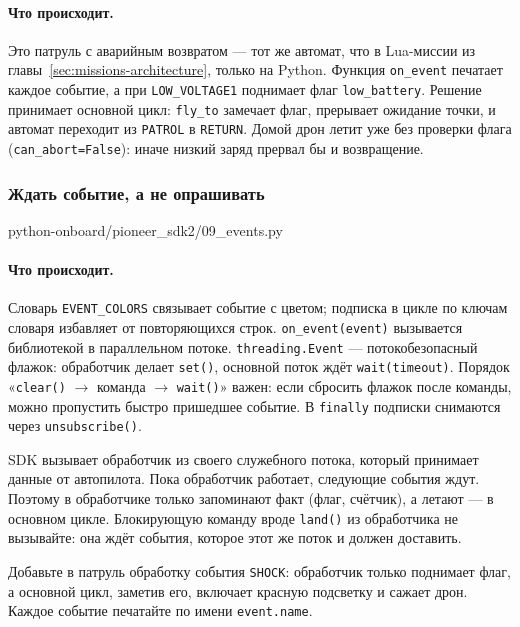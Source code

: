 \paragraph{Что происходит.} Это патруль с аварийным возвратом --- тот же автомат, что в Lua-миссии из главы~\ref{sec:missions-architecture}, только на Python. Функция \verb|on_event| печатает каждое событие, а при \verb|LOW_VOLTAGE1| поднимает флаг \verb|low_battery|. Решение принимает основной цикл: \verb|fly_to| замечает флаг, прерывает ожидание точки, и автомат переходит из \verb|PATROL| в \verb|RETURN|. Домой дрон летит уже без проверки флага (\verb|can_abort=False|): иначе низкий заряд прервал бы и возвращение.

\subsubsection*{Ждать событие, а не опрашивать}

\begin{codefile}[python]{python-onboard/pioneer_sdk2/09_events.py}
\end{codefile}

\paragraph{Что происходит.} Словарь \verb|EVENT_COLORS| связывает событие с цветом; подписка в цикле по ключам словаря избавляет от повторяющихся строк. \verb|on_event(event)| вызывается библиотекой в параллельном потоке. \verb|threading.Event| --- потокобезопасный флажок: обработчик делает \verb|set()|, основной поток ждёт \verb|wait(timeout)|. Порядок «\verb|clear()| $\to$ команда $\to$ \verb|wait()|» важен: если сбросить флажок после команды, можно пропустить быстро пришедшее событие. В \verb|finally| подписки снимаются через \verb|unsubscribe()|.

\begin{rulebox}
SDK вызывает обработчик из своего служебного потока, который принимает данные от автопилота. Пока обработчик работает, следующие события ждут. Поэтому в обработчике только запоминают факт (флаг, счётчик), а летают --- в основном цикле. Блокирующую команду вроде \verb|land()| из обработчика не вызывайте: она ждёт события, которое этот же поток и должен доставить.
\end{rulebox}

\begin{taskbox}
Добавьте в патруль обработку события \verb|SHOCK|: обработчик только поднимает флаг, а основной цикл, заметив его, включает красную подсветку и сажает дрон. Каждое событие печатайте по имени \verb|event.name|.
\end{taskbox}

